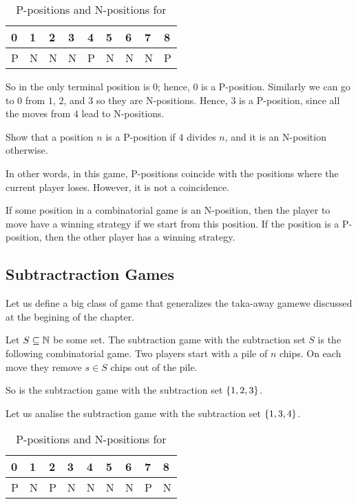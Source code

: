\begin{table}[h!]
  \centering
  \begin{tabular}{l l l l l l l l l}
      \toprule
      0 & 1 & 2 & 3 & 4 & 5 & 6 & 7 & 8 \\
      \midrule
      P & N & N & N & P & N & N & N & P \\
      \bottomrule
  \end{tabular}
  \caption{P-positions and N-positions for }
  \label{table:take-away-21-3-2-1}
\end{table}


So in  the only terminal position is $0$;
hence, $0$ is a P-position. Similarly we can go to $0$ from $1$, $2$, and
$3$ so they are N-positions. Hence, $3$ is a P-position,
since all the moves from $4$ lead to N-positions.
\begin{exercise}
  Show that a position $n$ is a P-position if $4$ divides $n$, and
  it is an N-position otherwise.
\end{exercise}

In other words, in this game, P-positions coincide with the positions where the
current player loses. However, it is not a coincidence.
\begin{theorem}
  If some position in a combinatorial game is an N-position, then the player to
  move have a winning strategy if we start from this position. If the position
  is a P-position, then the other player has a winning strategy.
\end{theorem}

\subsection{Subtractraction Games}
Let us define a big class of game that generalizes the taka-away gamewe
discussed at the begining of the chapter.
\begin{game}
  Let $S \subseteq \mathbb{N}$ be some set. The subtraction game with the subtraction
  set $S$ is the following combinatorial game.
  Two players start with a pile of $n$ chips.
  On each move they remove $s \in S$ chips out of the pile.
\end{game}

So  is the subtraction game with the subtraction
set $\set{1, 2, 3}$.

Let us analise the subtraction game with the subtraction set $\set{1, 3, 4}$.
\begin{table}[h!]
  \centering
  \begin{tabular}{l l l l l l l l l}
      \toprule
      0 & 1 & 2 & 3 & 4 & 5 & 6 & 7 & 8 \\
      \midrule
      P & N & P & N & N & N & N & P & N \\
      \bottomrule
  \end{tabular}
  \caption{P-positions and N-positions for }
  \label{table:take-away-21-3-2-1}
\end{table}

